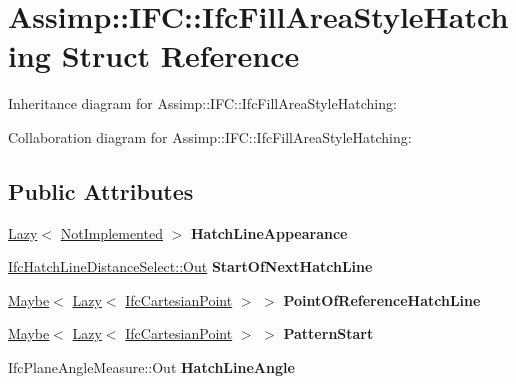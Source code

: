 \hypertarget{struct_assimp_1_1_i_f_c_1_1_ifc_fill_area_style_hatching}{\section{Assimp\+:\+:I\+F\+C\+:\+:Ifc\+Fill\+Area\+Style\+Hatching Struct Reference}
\label{struct_assimp_1_1_i_f_c_1_1_ifc_fill_area_style_hatching}
}


Inheritance diagram for Assimp\+:\+:I\+F\+C\+:\+:Ifc\+Fill\+Area\+Style\+Hatching\+:


Collaboration diagram for Assimp\+:\+:I\+F\+C\+:\+:Ifc\+Fill\+Area\+Style\+Hatching\+:
\subsection*{Public Attributes}
\begin{DoxyCompactItemize}
\item 
\hypertarget{struct_assimp_1_1_i_f_c_1_1_ifc_fill_area_style_hatching_abed15e41f6640751e8884bb61dab8780}{\hyperlink{struct_assimp_1_1_s_t_e_p_1_1_lazy}{Lazy}$<$ \hyperlink{struct_assimp_1_1_i_f_c_1_1_not_implemented}{Not\+Implemented} $>$ {\bfseries Hatch\+Line\+Appearance}}\label{struct_assimp_1_1_i_f_c_1_1_ifc_fill_area_style_hatching_abed15e41f6640751e8884bb61dab8780}

\item 
\hypertarget{struct_assimp_1_1_i_f_c_1_1_ifc_fill_area_style_hatching_ace6be7ec3b0be46df5b21409dea7d7e2}{\hyperlink{classboost_1_1shared__ptr}{Ifc\+Hatch\+Line\+Distance\+Select\+::\+Out} {\bfseries Start\+Of\+Next\+Hatch\+Line}}\label{struct_assimp_1_1_i_f_c_1_1_ifc_fill_area_style_hatching_ace6be7ec3b0be46df5b21409dea7d7e2}

\item 
\hypertarget{struct_assimp_1_1_i_f_c_1_1_ifc_fill_area_style_hatching_a4d12abf8e0ebba9ed9ac7eeaced6e995}{\hyperlink{struct_assimp_1_1_s_t_e_p_1_1_maybe}{Maybe}$<$ \hyperlink{struct_assimp_1_1_s_t_e_p_1_1_lazy}{Lazy}$<$ \hyperlink{struct_assimp_1_1_i_f_c_1_1_ifc_cartesian_point}{Ifc\+Cartesian\+Point} $>$ $>$ {\bfseries Point\+Of\+Reference\+Hatch\+Line}}\label{struct_assimp_1_1_i_f_c_1_1_ifc_fill_area_style_hatching_a4d12abf8e0ebba9ed9ac7eeaced6e995}

\item 
\hypertarget{struct_assimp_1_1_i_f_c_1_1_ifc_fill_area_style_hatching_a0596f59db3a01d315cb99dbee8f7f096}{\hyperlink{struct_assimp_1_1_s_t_e_p_1_1_maybe}{Maybe}$<$ \hyperlink{struct_assimp_1_1_s_t_e_p_1_1_lazy}{Lazy}$<$ \hyperlink{struct_assimp_1_1_i_f_c_1_1_ifc_cartesian_point}{Ifc\+Cartesian\+Point} $>$ $>$ {\bfseries Pattern\+Start}}\label{struct_assimp_1_1_i_f_c_1_1_ifc_fill_area_style_hatching_a0596f59db3a01d315cb99dbee8f7f096}

\item 
\hypertarget{struct_assimp_1_1_i_f_c_1_1_ifc_fill_area_style_hatching_a64cae6e197567692fd14123f01afe152}{Ifc\+Plane\+Angle\+Measure\+::\+Out {\bfseries Hatch\+Line\+Angle}}\label{struct_assimp_1_1_i_f_c_1_1_ifc_fill_area_style_hatching_a64cae6e197567692fd14123f01afe152}

\end{DoxyCompactItemize}
